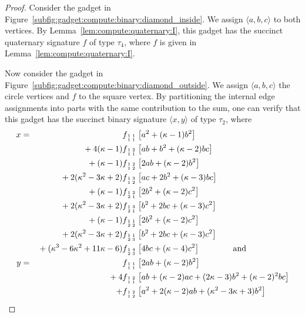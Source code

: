 \documentclass[11pt]{article}
\newcommand{\subMat}[4]{\mbox{\scriptsize $\begin{smallmatrix} #1 & #4 \\ #2 & #3 \end{smallmatrix}$}}
\begin{document}
\begin{proof}
 Consider the gadget in Figure~\ref{subfig:gadget:compute:binary:diamond_inside}.
 We assign $\langle a,b,c \rangle$ to both vertices.
 By Lemma~\ref{lem:compute:quaternary:I},
 this gadget has the succinct quaternary signature $f$ of type $\tau_4$,
 where $f$ is given in Lemma~\ref{lem:compute:quaternary:I}.
 
 Now consider the gadget in Figure~\ref{subfig:gadget:compute:binary:diamond_outside}.
 We assign $\langle a,b,c \rangle$ the circle vertices and $f$ to the square vertex.
 By partitioning the internal edge assignments into parts with the same contribution to the sum,
 one can verify that this gadget has the succinct binary signature $\langle x,y \rangle$ of type $\tau_2$,
 where
 \begin{alignat*}{2}
  x = &&{}                                          &f_{\subMat{1}{1}{1}{1}} \left[a^2 + (\kappa - 1) b^2\right]\\
      &&{}+                          4 (\kappa - 1) &f_{\subMat{1}{1}{1}{2}} \left[a b + b^2 + (\kappa - 2) b c\right]\\
      &&{}+                            (\kappa - 1) &f_{\subMat{1}{1}{2}{2}} \left[2 a b + (\kappa - 2) b^2\right]\\
      &&{}+             2 (\kappa^2 - 3 \kappa + 2) &f_{\subMat{1}{1}{2}{3}} \left[a c + 2 b^2 + (\kappa - 3) b c\right]\\
      &&{}+                            (\kappa - 1) &f_{\subMat{1}{2}{1}{2}} \left[2 b^2 + (\kappa - 2) c^2\right]\\
      &&{}+             2 (\kappa^2 - 3 \kappa + 2) &f_{\subMat{1}{2}{1}{3}} \left[b^2 + 2 b c + (\kappa - 3) c^2\right]\\
      &&{}+                            (\kappa - 1) &f_{\subMat{1}{2}{2}{1}} \left[2 b^2 + (\kappa - 2) c^2\right]\\
      &&{}+             2 (\kappa^2 - 3 \kappa + 2) &f_{\subMat{1}{2}{3}{1}} \left[b^2 + 2 b c + (\kappa - 3) c^2\right]\\
      &&{}+ (\kappa^3 - 6 \kappa^2 + 11 \kappa - 6) &f_{\subMat{1}{2}{3}{4}} \left[4 b c + (\kappa - 4) c^2\right]
      \qquad \qquad \text{and} \qquad\\
  y = &&{}                            &f_{\subMat{1}{1}{1}{1}} \left[2 a b + (\kappa - 2) b^2\right]\\
      &&{}+                         4 &f_{\subMat{1}{1}{1}{2}} \left[a b + (\kappa - 2) a c + (2 \kappa - 3) b^2 + (\kappa - 2)^2 b c\right]\\
      &&{}+                           &f_{\subMat{1}{1}{2}{2}} \left[a^2 + 2 (\kappa - 2) a b + (\kappa^2 - 3 \kappa + 3) b^2\right]\\

\end{alignat*}
\end{proof}
\end{document}
